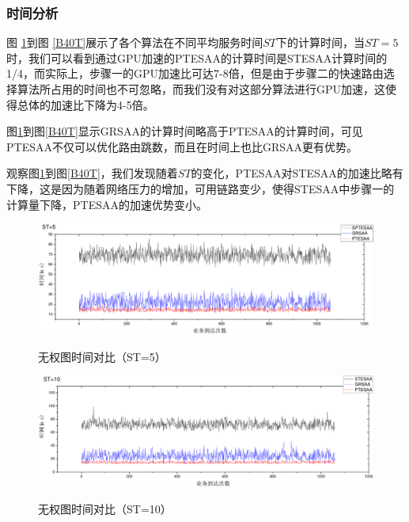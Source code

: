 \subsubsection{时间分析}

图 \ref{B5T}到图 \ref{B40T}展示了各个算法在不同平均服务时间$ST$下的计算时间，当$ST=5$时，我们可以看到通过GPU加速的PTESAA的计算时间是STESAA计算时间的1/4，而实际上，步骤一的GPU加速比可达7-8倍，但是由于步骤二的快速路由选择算法所占用的时间也不可忽略，而我们没有对这部分算法进行GPU加速，这使得总体的加速比下降为4-5倍。

图\ref{B5T}到图\ref{B40T}显示GRSAA的计算时间略高于PTESAA的计算时间，可见PTESAA不仅可以优化路由跳数，而且在时间上也比GRSAA更有优势。

观察图\ref{B5T}到图\ref{B40T}，我们发现随着$ST$的变化，PTESAA对STESAA的加速比略有下降，这是因为随着网络压力的增加，可用链路变少，使得STESAA中步骤一的计算量下降，PTESAA的加速优势变小。
\begin{figure}
\vspace{-0.5cm}
\setlength{\abovecaptionskip}{-0.5cm}
\begin{center}
{\includegraphics[width=1 \textwidth]{figures/B5T.pdf}}
\end{center}
\caption{{\footnotesize{无权图时间对比（ST=5）}}}
\label{B5T}
\end{figure}
\begin{figure}
\vspace{-0.5cm}
\setlength{\abovecaptionskip}{-0.5cm}
\begin{center}
{\includegraphics[width=1 \textwidth]{figures/B10T.pdf}}
\end{center}
\caption{{\footnotesize{无权图时间对比（ST=10）}}}
\label{B10T}
\end{figure}
